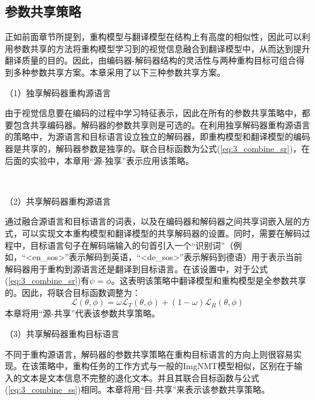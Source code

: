 \subsection{参数共享策略}
\label{sec:3_parameter_sharing}
% 
正如前面章节所提到，重构模型与翻译模型在结构上有高度的相似性，因此可以利用参数共享的方法将重构模型学习到的视觉信息融合到翻译模型中，从而达到提升翻译质量的目的。因此，由编码器-解码器结构的灵活性与两种重构目标可组合得到多种参数共享方案。本章采用了以下三种参数共享方案。

（1）{\sffamily 独享解码器重构源语言}


由于视觉信息要在编码的过程中学习特征表示，因此在所有的参数共享策略中，都要包含共享编码器。解码器的参数共享则是可选的。在利用独享解码器重构源语言的策略中，为源语言和目标语言设立独立的解码器，即重构模型和翻译模型的编码器是共享的，解码器参数是独享的。联合目标函数为公式(\ref{eq:3_combine_sr})，在后面的实验中，本章用“源-独享”表示应用该策略。

~~

（2）{\sffamily 共享解码器重构源语言}


通过融合源语言和目标语言的词表，以及在编码器和解码器之间共享词嵌入层的方式，可以实现文本重构模型和翻译模型的共享解码器的设置。同时，需要在解码过程中，目标语言句子在解码端输入的句首引入一个“识别词”（例如，“<en\_sos>”表示解码到英语，“<de\_sos>”表示解码到德语）用于表示当前解码器用于重构到源语言还是翻译到目标语言。在该设置中，对于公式(\ref{eq:3_combine_sr})有$\psi=\phi$。这表明该策略中翻译模型和重构模型是全参数共享的。因此，将联合目标函数调整为：
\begin{equation}
    \mathcal{L}(\theta, \phi)=\omega \mathcal{L}_T(\theta, \phi) + (1-\omega)\mathcal{L}_R(\theta, \phi)
    \label{eq:3_combine_ss}
\end{equation}
本章将用“源-共享”代表该参数共享策略。

（3）{\sffamily 共享解码器重构目标语言}


不同于重构源语言，解码器的参数共享策略在重构目标语言的方向上则很容易实现。在该策略中，重构任务的工作方式与一般的ImgNMT模型相似，区别在于输入的文本是文本信息不完整的退化文本。并且其联合目标函数与公式(\ref{eq:3_combine_ss})相同。本章将用“目-共享”来表示该参数共享策略。